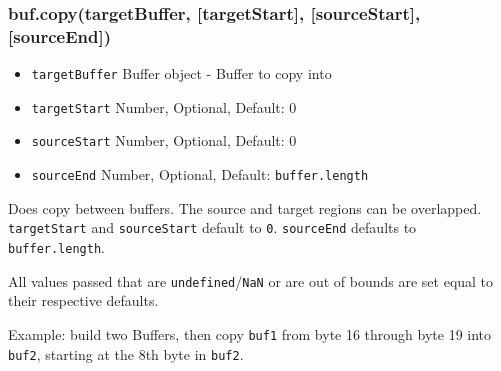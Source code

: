 \begin{Shaded}
\begin{Highlighting}[]
\NormalTok{;}
 \NormalTok{);}

 \NormalTok{(}  
\NormalTok{\}}


\end{Highlighting}
\end{Shaded}

\subsubsection{buf.copy(targetBuffer, {[}targetStart{]},
{[}sourceStart{]}, {[}sourceEnd{]})}

\begin{itemize}
\item
  \texttt{targetBuffer} Buffer object - Buffer to copy into
\item
  \texttt{targetStart} Number, Optional, Default: 0
\item
  \texttt{sourceStart} Number, Optional, Default: 0
\item
  \texttt{sourceEnd} Number, Optional, Default: \texttt{buffer.length}
\end{itemize}

Does copy between buffers. The source and target regions can be
overlapped. \texttt{targetStart} and \texttt{sourceStart} default to
\texttt{0}. \texttt{sourceEnd} defaults to \texttt{buffer.length}.

All values passed that are \texttt{undefined}/\texttt{NaN} or are out of
bounds are set equal to their respective defaults.

Example: build two Buffers, then copy \texttt{buf1} from byte 16 through
byte 19 into \texttt{buf2}, starting at the 8th byte in \texttt{buf2}.

